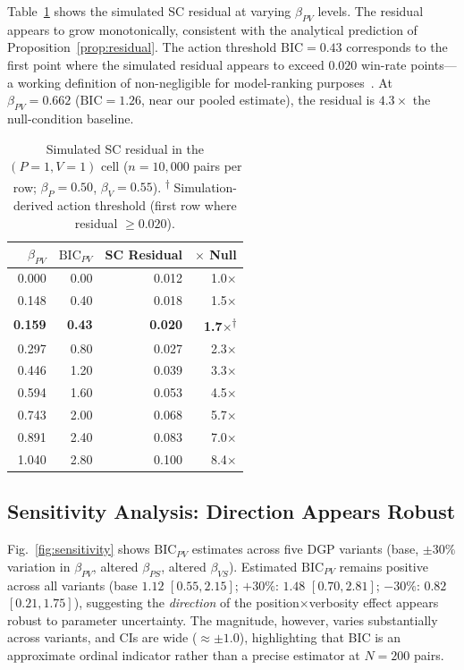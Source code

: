 \documentclass[10pt,conference]{IEEEtran}
\newcommand{\BIC}{\mathrm{BIC}}
\begin{document}
Table~\ref{tab:theorem} shows the simulated SC residual
at varying $\beta_{PV}$ levels.
The residual appears to grow monotonically, consistent
with the analytical prediction of Proposition~\ref{prop:residual}.
The action threshold $\BIC{=}0.43$ corresponds to the first
point where the simulated residual appears to exceed
$0.020$ win-rate points---a working definition of
non-negligible for model-ranking
purposes~\cite{zheng2023judging}.
At $\beta_{PV}{=}0.662$ ($\BIC{=}1.26$, near our
pooled estimate), the residual is $4.3{\times}$ the
null-condition baseline.

\begin{table}[htbp]
\centering
\caption{Simulated SC residual in the $(P{=}1,V{=}1)$
cell ($n{=}10{,}000$ pairs per row; $\beta_P{=}0.50$,
$\beta_V{=}0.55$).
\textsuperscript{$\dagger$} Simulation-derived action
threshold (first row where residual ${\geq}0.020$).}
\label{tab:theorem}
\small
\setlength{\tabcolsep}{4pt}
\begin{tabular}{rrrr}
\toprule
$\beta_{PV}$ & $\BIC_{PV}$ &
  \textbf{SC Residual} & $\times$ Null \\
\midrule
0.000 & 0.00 & 0.012 & 1.0$\times$ \\
0.148 & 0.40 & 0.018 & 1.5$\times$ \\
\rowcolor[gray]{0.88}
\textbf{0.159} & \textbf{0.43}
  & \textbf{0.020}
  & \textbf{1.7$\times$\textsuperscript{$\dagger$}} \\
0.297 & 0.80 & 0.027 & 2.3$\times$ \\
0.446 & 1.20 & 0.039 & 3.3$\times$ \\
0.594 & 1.60 & 0.053 & 4.5$\times$ \\
0.743 & 2.00 & 0.068 & 5.7$\times$ \\
0.891 & 2.40 & 0.083 & 7.0$\times$ \\
1.040 & 2.80 & 0.100 & 8.4$\times$ \\
\bottomrule
\end{tabular}
\end{table}

\subsection{Sensitivity Analysis: Direction Appears Robust}

Fig.~\ref{fig:sensitivity} shows $\BIC_{PV}$ estimates
across five DGP variants (base, $\pm 30\%$ variation
in $\beta_{PV}$, altered $\beta_{PS}$, altered $\beta_{VS}$).
Estimated $\BIC_{PV}$ remains positive across all variants
(base $1.12$ $[0.55,2.15]$; $+30\%$: $1.48$ $[0.70,2.81]$;
$-30\%$: $0.82$ $[0.21,1.75]$), suggesting the \textit{direction}
of the position$\times$verbosity effect appears robust to
parameter uncertainty.
The magnitude, however, varies substantially across
variants, and CIs are wide (${\approx}\pm 1.0$),
highlighting that BIC is an approximate ordinal indicator
rather than a precise estimator at $N{=}200$ pairs.
\end{document}
